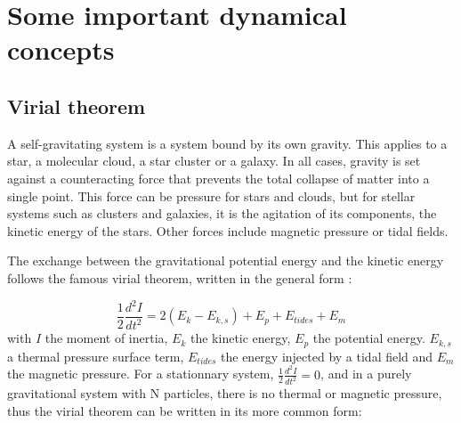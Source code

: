%
%

%


\section{Some important dynamical concepts}


\subsection{Virial theorem}

A self-gravitating system is a system bound by its own gravity. This applies to a star, a molecular cloud, a star cluster or a galaxy. In all cases, gravity is set against a counteracting force that prevents the total collapse of matter into a single point. This force can be pressure for stars and clouds, but for stellar systems such as clusters and galaxies, it is the agitation of its components, the kinetic energy of the stars. Other forces include magnetic pressure or tidal fields.

The exchange between the gravitational potential energy and the kinetic energy follows the famous virial theorem, written in the general form \citep{McKee2007,BT}:

\begin{equation}
\frac{1}{2} \frac{d^2 I}{dt^2} = 2 ( E_k - E_{k,s}) +  E_p + E_{tides} + E_m
\end{equation}
with $I$ the moment of inertia, $E_k$ the kinetic energy, $E_p$ the potential energy. $E_{k,s}$  a thermal pressure surface term, $E_{tides}$ the energy injected by a tidal field and $E_m$ the magnetic pressure. For a stationnary system, $\frac{1}{2} \frac{d^2 I}{dt^2} = 0$, and in a purely gravitational system with N particles, there is no thermal or magnetic pressure, thus the virial theorem can be written in its more common form:

